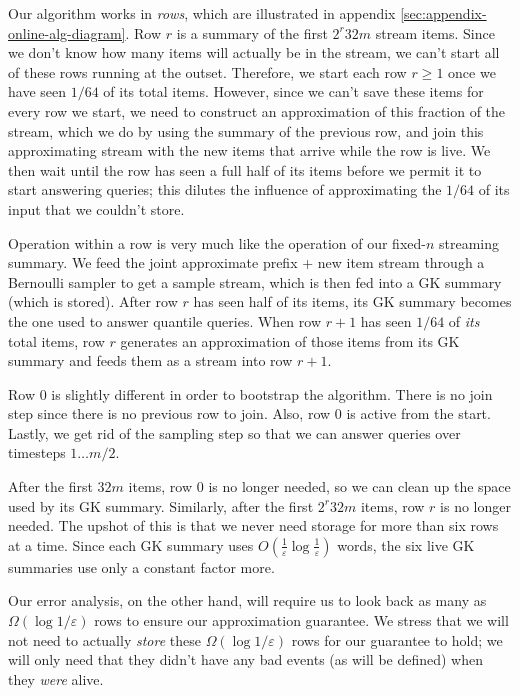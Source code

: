 \documentclass{article}
\theoremstyle{plain}
\def\ep{\varepsilon}
\newcommand{\p}[1]{(#1)}
\newcommand{\OO}[1]{O\p{#1}}
\newcommand{\OT}[1]{\Omega\p{#1}}
\begin{document}
Our algorithm works in \emph{rows}, which are illustrated in appendix
\ref{sec:appendix-online-alg-diagram}. Row $r$ is a summary of the first $2^r 32
m$ stream items. Since we don't know how many items will actually be in the
stream, we can't start all of these rows running at the outset. Therefore, we
start each row $r \ge 1$ once we have seen $1/64$ of its total items. However,
since we can't save these items for every row we start, we need to construct an
approximation of this fraction of the stream, which we do by using the summary
of the previous row, and join this approximating stream with the new items that
arrive while the row is live. We then wait until the row has seen a full half of
its items before we permit it to start answering queries; this dilutes the
influence of approximating the $1/64$ of its input that we couldn't store.

Operation within a row is very much like the operation of our fixed-$n$
streaming summary. We feed the joint approximate prefix + new item stream
through a Bernoulli sampler to get a sample stream, which is then fed into a GK
summary (which is stored). After row $r$ has seen half of its items, its GK
summary becomes the one used to answer quantile queries. When row $r+1$ has seen
$1/64$ of \emph{its} total items, row $r$ generates an approximation of those
items from its GK summary and feeds them as a stream into row $r+1$.

Row $0$ is slightly different in order to bootstrap the algorithm. There is no
join step since there is no previous row to join. Also, row $0$ is active from
the start. Lastly, we get rid of the sampling step so that we can answer queries
over timesteps $1 \ldots m/2$.

After the first $32 m$ items, row $0$ is no longer needed, so we can clean up
the space used by its GK summary. Similarly, after the first $2^r 32 m$ items,
row $r$ is no longer needed. The upshot of this is that we never need storage
for more than six rows at a time. Since each GK summary uses $\OO{\frac{1}{\ep}
  \log \frac{1}{\ep}}$ words, the six live GK summaries use only a constant
factor more.

Our error analysis, on the other hand, will require us to look back as many as
$\OT{\log 1/\ep}$ rows to ensure our approximation guarantee. We stress that we
will not need to actually \emph{store} these $\OT{\log 1/\ep}$ rows for our
guarantee to hold; we will only need that they didn't have any bad events (as
will be defined) when they \emph{were} alive.
\end{document}
